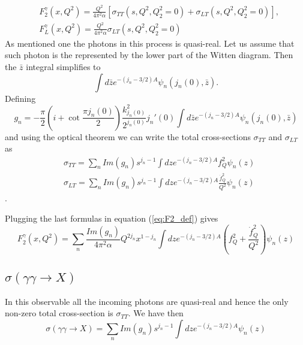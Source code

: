 \documentclass[preprint, 12pt]{elsarticle}
\begin{document}
\begin{align}
	\label{eq:F2_def}
	&F_2^{\gamma} \left(x, Q^2\right) = \frac{Q^2}{4 \pi^2 \alpha} \left[ \sigma_{TT}\left(s, Q^2, Q_2^2 = 0\right) +   \sigma_{LT}\left(s, Q^2, Q_2^2 = 0\right)\right] , \\
	&F_L^{\gamma} \left(x, Q^2\right) = \frac{Q^2}{4 \pi^2 \alpha} \sigma_{LT}\left(s, Q^2, Q_2^2 = 0\right)
\end{align}
As mentioned one the photons in this process is quasi-real. Let us assume that such photon is the represented by the lower part of the Witten diagram. Then the $\bar{z}$ integral simplifies to 
\begin{equation}
\int d\bar{z} e^{- \left(j_n - 3/2\right) A} \psi_n \left(j_n\left(0\right), \bar{z}\right).
\end{equation}
Defining
\begin{equation}
g_n = - \frac{\pi}{2} \left( i + \cot \frac{\pi j_n\left(0\right)}{2} \right) \frac{k^2_{j_n\left(0\right)}}{2^{j_n\left(0\right)}} j_n'\left(0\right) \int d\bar{z} e^{- \left(j_n - 3/2\right) A} \psi_n \left(j_n\left(0\right), \bar{z}\right)
\end{equation}
and using the optical theorem we can write the total cross-sections $\sigma_{TT}$ and $\sigma_{LT}$ as
\begin{align}
&\sigma_{TT} =  \sum_n Im\left(g_n\right) s^{j_n - 1} \int dz e^{-\left(j_n - 3/2\right) A} f_Q^2 \psi_n\left(z\right) \\
&\sigma_{LT} =  \sum_n  Im\left(g_n\right) s^{j_n - 1} \int dz e^{-\left(j_n - 3/2\right) A} \frac{\dot{f}_Q^2}{Q^2} \psi_n\left(z\right)
\end{align}.

Plugging the last formulas in equation (\ref{eq:F2_def}) gives
\begin{equation}
\label{eq:holographic_F2Photon}
F_2^{\gamma} \left(x, Q^2\right) =  \sum_n \frac{ Im\left(g_n\right)}{4 \pi^2 \alpha} Q^{2 j_n} x^{1- j_n} \int dz e^{-\left(j_n - 3/2\right) A}\left( f_Q^2 + \frac{\dot{f}_Q^2}{Q^2}\right) \psi_n\left(z\right)
\end{equation}

\subsection{$\sigma\left(\gamma \gamma \rightarrow X\right)$}
In this observable all the incoming photons are quasi-real and hence the only non-zero total cross-section is $\sigma_{TT}$. We have then
\begin{equation}
\sigma\left(\gamma \gamma \rightarrow X\right) =  \sum_n Im\left(g_n\right) s^{j_n - 1} \int dz e^{-\left(j_n - 3/2\right) A} \psi_n\left(z\right)
\end{equation}
\end{document}
